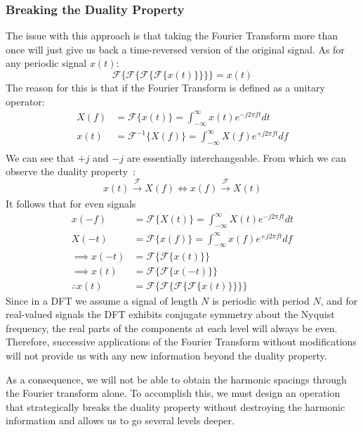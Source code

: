 \documentclass[11pt,twoside]{report}
\numberwithin{thm}{section}
\numberwithin{equation}{section}
\begin{document}
\subsubsection{Breaking the Duality Property}
The issue with this approach is that taking the Fourier Transform more than once will just give us back a time-reversed version of the original signal. As for any periodic signal $x(t)$:
\begin{equation}
  \mathcal{F}\{\mathcal{F}\{\mathcal{F}\{\mathcal{F}\{x(t)\}\}\}\} = x(t)  
\end{equation}
The reason for this is that if the Fourier Transform is defined as a unitary operator:
\begin{align*}
    X(f)&=\mathcal{F}\{x(t)\}=\int_{-\infty}^\infty x(t)e^{-j2\pi f t}dt\\
    x(t)&=\mathcal{F}^{-1}\{X(f)\}=\int_{-\infty}^\infty X(f) e^{+j2\pi f t}df\\
\end{align*}
We can see that $+j$ and $-j$ are essentially interchangeable. From which we can observe the duality property~\cite{MIT_2011}:
\begin{equation}
    x(t) \xrightarrow[]{\mathcal{F}}X(f) \iff x(f) \xrightarrow[]{\mathcal{F}}X(t) 
\end{equation}
It follows that for even signals
\begin{align*}
    x(-f) &= \mathcal{F}\{X(t)\} = \int_{-\infty}^\infty X(t)e^{-j2\pi f t}dt\\
    X(-t) &= \mathcal{F}\{x(f)\} = \int_{-\infty}^\infty x(f)e^{+j2\pi f t}df \\
    \implies x(-t) &= \mathcal{F}\{\mathcal{F}\{x(t)\}\} \\
    \implies x(t) &= \mathcal{F}\{\mathcal{F}\{x(-t)\}\} \\
    \therefore x(t) &= \mathcal{F}\{\mathcal{F}\{\mathcal{F}\{\mathcal{F}\{x(t)\}\}\}\}
\end{align*}
Since in a DFT we assume a signal of length $N$ is periodic with period $N$, and for real-valued signals the DFT exhibits conjugate symmetry about the Nyquist frequency, the real parts of the components at each level will always be even. Therefore, successive applications of the Fourier Transform without modifications will not provide us with any new information beyond the duality property.

As a consequence, we will not be able to obtain the harmonic spacings through the Fourier transform alone. To accomplish this, we must design an operation that strategically breaks the duality property without destroying the harmonic information and allows us to go several levels deeper.
\end{document}
